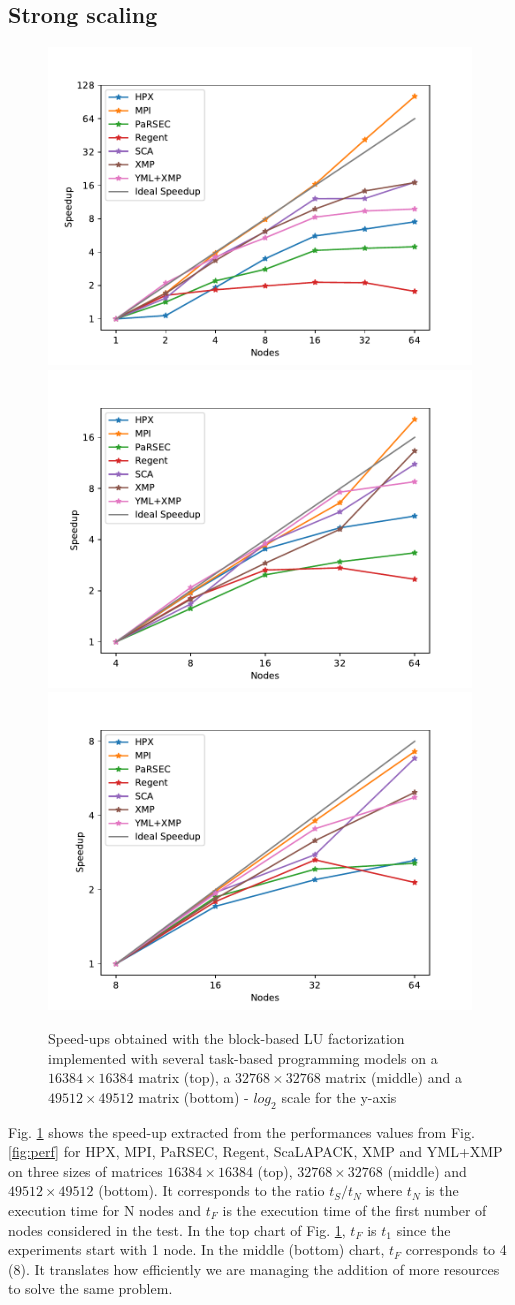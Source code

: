 \subsection{Strong scaling}
\label{sec:strong_scaling}
\begin{figure}[h]
	\centering
	\includegraphics[width=.55\linewidth]{fig_strong_scaling_speedup_task}
	\includegraphics[width=.55\linewidth]{fig_strong_scaling_speedup_task_32k}
	\includegraphics[width=.55\linewidth]{fig_strong_scaling_speedup_task_49k}
	\caption{Speed-ups obtained with the block-based LU factorization implemented with several task-based programming models on a $16384 \times 16384$ matrix (top), a $32768 \times 32768$ matrix (middle) and a $49512 \times 49512$ matrix (bottom) - $log_2$ scale for the y-axis\label{fig:strong_scaling}}
\end{figure}

Fig. \ref{fig:strong_scaling} shows the speed-up extracted from the performances values from Fig. \ref{fig:perf} for HPX, MPI, PaRSEC, Regent, ScaLAPACK, XMP and YML+XMP on three sizes of matrices $16384 \times 16384$ (top), $32768 \times 32768$ (middle) and $49512 \times 49512$ (bottom).
It corresponds to the ratio $t_S/t_N$ where $t_N$ is the execution time for N nodes and $t_F$ is the execution time of the first number of nodes considered in the test.
In the top chart of Fig. \ref{fig:strong_scaling}, $t_F$ is $t_1$ since the experiments start with 1 node.
In the middle (bottom) chart, $t_F$ corresponds to 4 (8).
It translates how efficiently we are managing the addition of more resources to solve the same problem.

